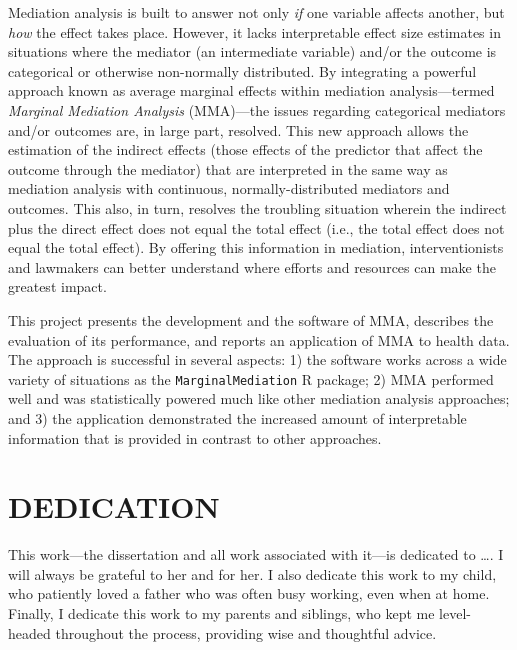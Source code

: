 \documentclass[]{DissertateUSU}
\begin{document}
Mediation analysis is built to answer not only \emph{if} one variable
affects another, but \emph{how} the effect takes place. However, it
lacks interpretable effect size estimates in situations where the
mediator (an intermediate variable) and/or the outcome is categorical or
otherwise non-normally distributed. By integrating a powerful approach
known as average marginal effects within mediation analysis---termed
\emph{Marginal Mediation Analysis} (MMA)---the issues regarding
categorical mediators and/or outcomes are, in large part, resolved. This
new approach allows the estimation of the indirect effects (those
effects of the predictor that affect the outcome through the mediator)
that are interpreted in the same way as mediation analysis with
continuous, normally-distributed mediators and outcomes. This also, in
turn, resolves the troubling situation wherein the indirect plus the
direct effect does not equal the total effect (i.e., the total effect
does not equal the total effect). By offering this information in
mediation, interventionists and lawmakers can better understand where
efforts and resources can make the greatest impact.

This project presents the development and the software of MMA, describes
the evaluation of its performance, and reports an application of MMA to
health data. The approach is successful in several aspects: 1) the
software works across a wide variety of situations as the
\texttt{MarginalMediation} R package; 2) MMA performed well and was
statistically powered much like other mediation analysis approaches; and
3) the application demonstrated the increased amount of interpretable
information that is provided in contrast to other approaches.

\singlespacing

\newpage

 \fancyhead[R]{\thepage} \fancyfoot[C]{}
\chapter*{DEDICATION} 

This work---the dissertation and all work associated with it---is
dedicated to \ldots. I will always be grateful to her and for her. I
also dedicate this work to my child, who patiently loved a father who
was often busy working, even when at home. Finally, I dedicate this work
to my parents and siblings, who kept me level-headed throughout the
process, providing wise and thoughtful advice.
\end{document}
